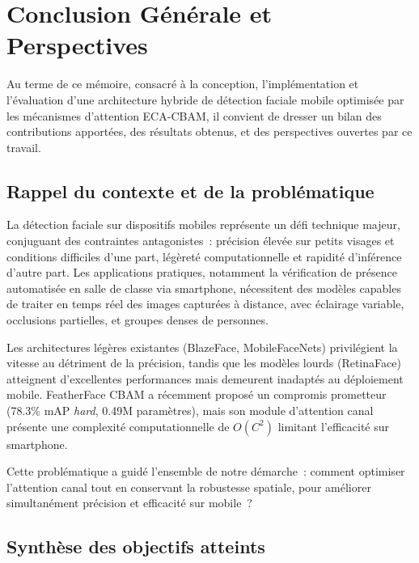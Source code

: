 \chapter*{Conclusion Générale et Perspectives}
\begin{onehalfspace}

\hspace{0.65 cm}Au terme de ce mémoire, consacré à la conception, l'implémentation et l'évaluation d'une architecture hybride de détection faciale mobile optimisée par les mécanismes d'attention ECA-CBAM, il convient de dresser un bilan des contributions apportées, des résultats obtenus, et des perspectives ouvertes par ce travail.

\section*{Rappel du contexte et de la problématique}

\hspace{0.65 cm}La détection faciale sur dispositifs mobiles représente un défi technique majeur, conjuguant des contraintes antagonistes~: précision élevée sur petits visages et conditions difficiles d'une part, légèreté computationnelle et rapidité d'inférence d'autre part. Les applications pratiques, notamment la vérification de présence automatisée en salle de classe via smartphone, nécessitent des modèles capables de traiter en temps réel des images capturées à distance, avec éclairage variable, occlusions partielles, et groupes denses de personnes.

\hspace{0.65 cm}Les architectures légères existantes (BlazeFace, MobileFaceNets) privilégient la vitesse au détriment de la précision, tandis que les modèles lourds (RetinaFace) atteignent d'excellentes performances mais demeurent inadaptés au déploiement mobile. FeatherFace CBAM \cite{Kim2025FeatherFace} a récemment proposé un compromis prometteur (78.3\% mAP \textit{hard}, 0.49M paramètres), mais son module d'attention canal présente une complexité computationnelle de $O(C^2)$ limitant l'efficacité sur smartphone.

\hspace{0.65 cm}Cette problématique a guidé l'ensemble de notre démarche~: comment optimiser l'attention canal tout en conservant la robustesse spatiale, pour améliorer simultanément précision et efficacité sur mobile~?

\section*{Synthèse des objectifs atteints}


\end{onehalfspace}
